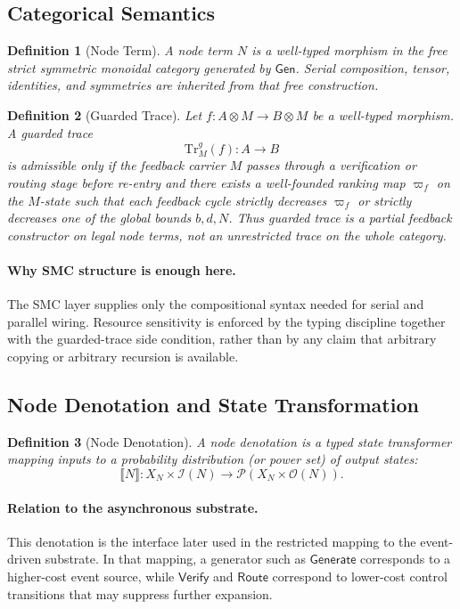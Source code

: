 \documentclass[11pt]{article}
\newtheorem{definition}{Definition}[section]
\theoremstyle{remark}
\begin{document}
\subsection{Categorical Semantics}

\begin{definition}[Node Term]
A node term \(N\) is a well-typed morphism in the free strict symmetric monoidal category generated by \(\mathsf{Gen}\). Serial composition, tensor, identities, and symmetries are inherited from that free construction.
\end{definition}

\begin{definition}[Guarded Trace]\label{def:guarded-trace}
Let \(f:A\otimes M\to B\otimes M\) be a well-typed morphism. A guarded trace
\[
\mathrm{Tr}^{g}_{M}(f):A\to B
\]
is admissible only if the feedback carrier \(M\) passes through a verification or routing stage before re-entry and there exists a well-founded ranking map \(\varpi_f\) on the \(M\)-state such that each feedback cycle strictly decreases \(\varpi_f\) or strictly decreases one of the global bounds \(b,d,N\). Thus guarded trace is a partial feedback constructor on legal node terms, not an unrestricted trace on the whole category.
\end{definition}

\paragraph{Why SMC structure is enough here.}
The SMC layer supplies only the compositional syntax needed for serial and parallel wiring. Resource sensitivity is enforced by the typing discipline together with the guarded-trace side condition, rather than by any claim that arbitrary copying or arbitrary recursion is available.

\subsection{Node Denotation and State Transformation}

\begin{definition}[Node Denotation]
A node denotation is a typed state transformer mapping inputs to a probability distribution (or power set) of output states:
\[
\llbracket N \rrbracket : X_N \times \mathcal{I}(N) \to \mathcal{P}(X_N \times \mathcal{O}(N)).
\]
\end{definition}

\paragraph{Relation to the asynchronous substrate.}
This denotation is the interface later used in the restricted mapping to the event-driven substrate. In that mapping, a generator such as \(\mathsf{Generate}\) corresponds to a higher-cost event source, while \(\mathsf{Verify}\) and \(\mathsf{Route}\) correspond to lower-cost control transitions that may suppress further expansion.
\end{document}
